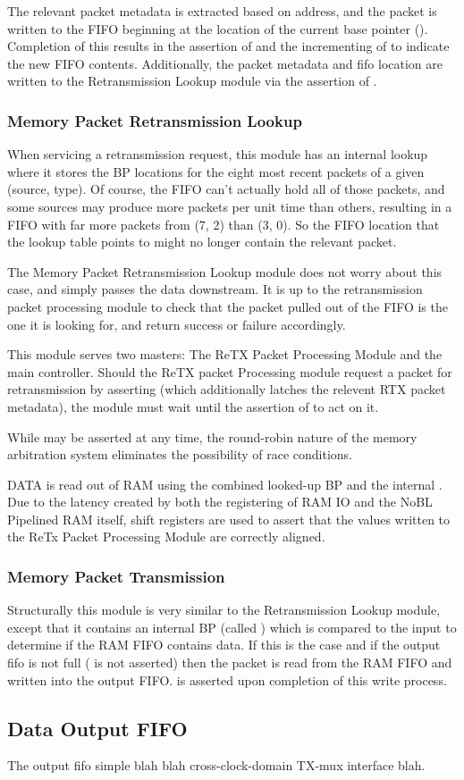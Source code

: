  The relevant packet metadata is extracted based on
address, and the packet is written to the FIFO beginning at the
location of the current base pointer (). Completion of
this results in the assertion of  and the incrementing of
 to indicate the new FIFO contents.  Additionally, the
packet metadata and fifo location are written to the Retransmission
Lookup module via the assertion of .

\subsubsection{Memory Packet Retransmission Lookup} 
When servicing a retransmission request, this module has an internal
lookup where it stores the BP locations for the eight most recent
packets of a given (source, type). Of course, the FIFO can't actually
hold all of those packets, and some sources may produce more packets
per unit time than others, resulting in a FIFO with far more packets
from (7, 2) than (3, 0). So the FIFO location that the lookup table
points to might no longer contain the relevant packet.

The Memory  Packet Retransmission Lookup  module does not  worry about
this case,  and simply  passes the  data downstream. It  is up  to the
retransmission  packet  processing module  to  check  that the  packet
pulled  out of  the FIFO  is the  one it  is looking  for,  and return
success or failure accordingly.
 

This module serves two masters: The ReTX Packet Processing Module and
the main controller. Should the ReTX packet Processing module request
a packet for retransmission by asserting  (which
additionally latches the relevent RTX packet metadata), the module
must wait until the assertion of  to act on it.

While  may be asserted at any time, the round-robin
nature of the memory arbitration system eliminates the possibility of
race conditions.

DATA is read out of RAM using the combined looked-up BP and the
internal . Due to the latency created by both the
registering of RAM IO and the NoBL Pipelined RAM itself, shift
registers are used to assert that the values written to the ReTx
Packet Processing Module are correctly aligned.

\subsubsection{Memory Packet Transmission}
Structurally this module is very similar to the Retransmission Lookup
module, except that it contains an internal BP (called
) which is compared to the input
 to determine if the RAM FIFO contains data.  If this
is the case and if the output fifo is not full ( is
not asserted) then the packet is read from the RAM FIFO and written
into the output FIFO.  is asserted upon completion of
this write process.


\subsection{Data Output FIFO}
The output fifo simple blah blah cross-clock-domain TX-mux interface blah. 

